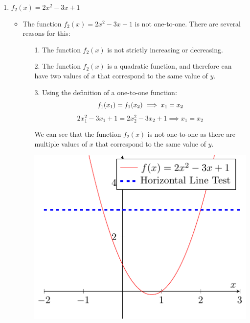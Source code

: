 \documentclass[12pt]{report}
\begin{document}
\begin{enumerate}[leftmargin=\labelsep]
\begin{enumerate}
\newpage
            \item $f_2(x)=2x^2-3x+1$
                \begin{tcolorbox}
                    \begin{itemize}[label={}]
                        \item The function $f_2(x)=2x^2-3x+1$ is not one-to-one. There are several reasons for this:
                        \begin{enumerate}
                            \item[1.] The function $f_2(x)$ is not strictly increasing or decreasing.
                            \item[2.] The function $f_2(x)$ is a quadratic function, and therefore can have two values of $x$ that correspond to the same value of $y$. 
                            \item[3.] Using the definition of a one-to-one function:
                            \begin{equation*}
                                f_1(x_1) = f_1(x_2) \implies x_1 = x_2 \\
                            \end{equation*} 
                            \begin{equation*}
                                2x_1^2-3x_1+1 = 2x_2^2-3x_2+1 \implies x_1 = x_2
                            \end{equation*}
                            \item[] We can see that the function $f_2(x)$ is not one-to-one as there are multiple values of $x$ that correspond to the same value of $y$.
                            \begin{center}
                                \includegraphics[width=0.8\linewidth]{lib/figures/Figure1.pdf}
                            \end{center}
                        \end{enumerate}
                    \end{itemize}
                \end{tcolorbox}


\end{enumerate}
\end{enumerate}
\end{document}

